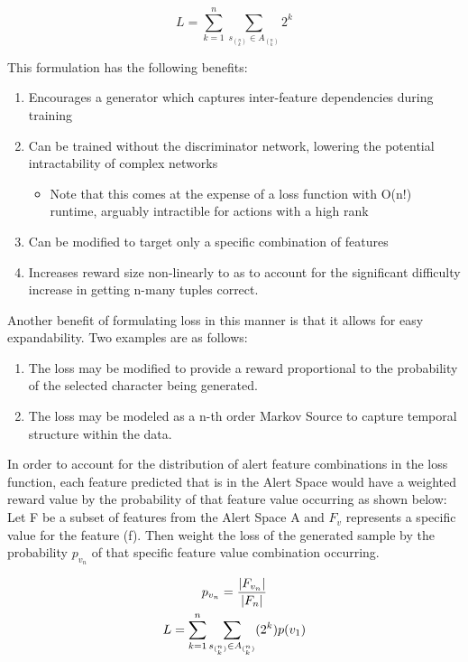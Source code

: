 \begin{equation}
L = \sum_{k=1}^{n}\sum_{s_{{(^n_k)}} \in A_{(^n_k)}} 2^k
\end{equation}

This formulation has the following benefits:
\begin{enumerate}
	\item Encourages a generator which captures inter-feature dependencies during training
	\item Can be trained without the discriminator network, lowering the potential intractability of complex networks
	\begin{itemize}
		\item Note that this comes at the expense of a loss function with O(n!) runtime, arguably intractible for actions with a high rank
	\end{itemize}
	\item Can be modified to target only a specific combination of features
	\item Increases reward size non-linearly to as to account for the significant difficulty increase in getting n-many tuples correct.
\end{enumerate}

Another benefit of formulating loss in this manner is that it allows for easy expandability. Two examples are as follows: 
\begin{enumerate}
	\item The loss may be modified to provide a reward proportional to the probability of the selected character being generated. 
	\item The loss may be modeled as a n-th order Markov Source to capture temporal structure within the data. 
\end{enumerate}

In order to account for the distribution of alert feature combinations in the loss function, each feature predicted that is in the Alert Space would have a weighted reward value by the probability of that feature value occurring as shown below: Let F be a subset of features from the Alert Space A and $F_v$ represents a specific value for the feature (f). Then weight the loss of the generated sample by the probability $p_{v_n}$ of that specific feature value combination occurring. 

\begin{gather}
p_{v_n} = {|F_{v_n}| \over |F_n|}\\
L = \sum_{k=1}^{n}\sum_{s_{{(^n_k)}} \in A_{(^n_k)}} (2^k)p(v_1)
\end{gather}

